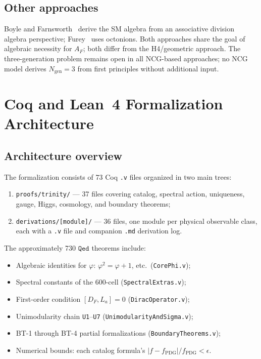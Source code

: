 \documentclass[12pt,a4paper]{article}
\newcommand{\AF}{A_F}
\newcommand{\Qed}{\texttt{Qed}}
\begin{document}
\subsection{Other approaches}

Boyle and Farnsworth~\cite{Boyle:2019} derive the SM algebra from an associative division
algebra perspective; Furey~\cite{Furey:2018} uses octonions. Both approaches share the
goal of algebraic necessity for \(\AF\); both differ from the H4/geometric approach.
The three-generation problem remains open in all NCG-based approaches;
no NCG model derives \(N_{\mathrm{gen}} = 3\) from first principles without additional input.


\section{Coq and Lean~4 Formalization Architecture}
\label{sec:coq}

\subsection{Architecture overview}

The formalization consists of 73 Coq \texttt{.v} files organized in two main trees:
\begin{enumerate}
  \item \texttt{proofs/trinity/} --- 37 files covering catalog, spectral action,
    uniqueness, gauge, Higgs, cosmology, and boundary theorems;
  \item \texttt{derivations/[module]/} --- 36 files, one module per physical observable class,
    each with a \texttt{.v} file and companion \texttt{.md} derivation log.
\end{enumerate}

The approximately 730 \(\Qed\) theorems include:
\begin{itemize}
  \item Algebraic identities for \(\varphi\): \(\varphi^2 = \varphi + 1\), etc.\ (\texttt{CorePhi.v});
  \item Spectral constants of the 600-cell (\texttt{SpectralExtras.v});
  \item First-order condition \([D_F, L_a]=0\) (\texttt{DiracOperator.v});
  \item Unimodularity chain \texttt{U1}--\texttt{U7} (\texttt{UnimodularityAndSigma.v});
  \item BT-1 through BT-4 partial formalizations (\texttt{BoundaryTheorems.v});
  \item Numerical bounds: each catalog formula's \(|f - f_{\mathrm{PDG}}|/f_{\mathrm{PDG}} < \epsilon\).
\end{itemize}
\end{document}
